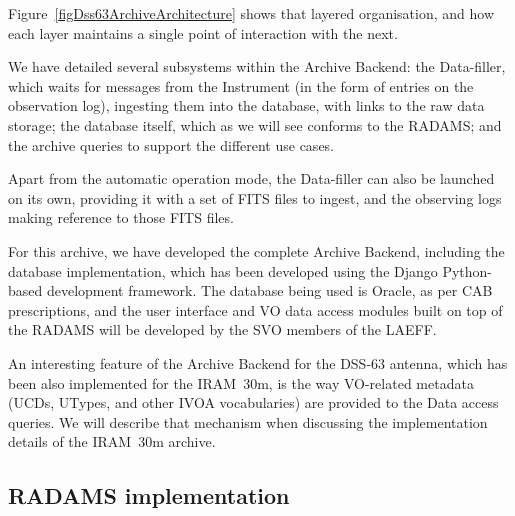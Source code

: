 			
			Figure~\ref{figDss63ArchiveArchitecture} shows that
			layered organisation, and how each layer maintains a
			single point of interaction with the next.
			
			
			We have detailed several subsystems within the 
			Archive Backend: the Data-filler, which waits for messages
			from the Instrument (in the form of entries on the
			observation log), ingesting them into the database,
			with links to the raw data storage; the database itself,
			which as we will see conforms to the RADAMS; and
			the archive queries to support the different use cases.
			
			Apart from the automatic operation mode, the Data-filler
			can
			also be launched on its own, providing it with a set of
			FITS files to ingest, and the observing logs making
			reference to those FITS files.
			
			For this archive, we have developed the complete Archive
			Backend, including the database implementation, which
			has been developed using the
			Django
			Python-based development framework. The database being
			used is Oracle, as per CAB prescriptions, and the user
			interface and VO data access modules built on top of
			the RADAMS will be developed by the SVO members of the
			LAEFF.
			
			An interesting feature of the Archive Backend for the
			DSS-63 antenna, which has been also implemented for
			the IRAM~30m, is the way VO-related metadata (UCDs,
			UTypes, and other IVOA vocabularies) are provided 
			to the Data access queries. We will describe that
			mechanism when discussing the implementation details
			of the IRAM~30m archive.
			
		
		\subsection{RADAMS implementation} %
		\label{sub:radams_implementation_dss63}
			\newcommand{\dsssixtythreesqlurl}
			{http://www.iaa.es/~jdsant/thesis/dss63-sourceDM-v0_5.sql}
			

